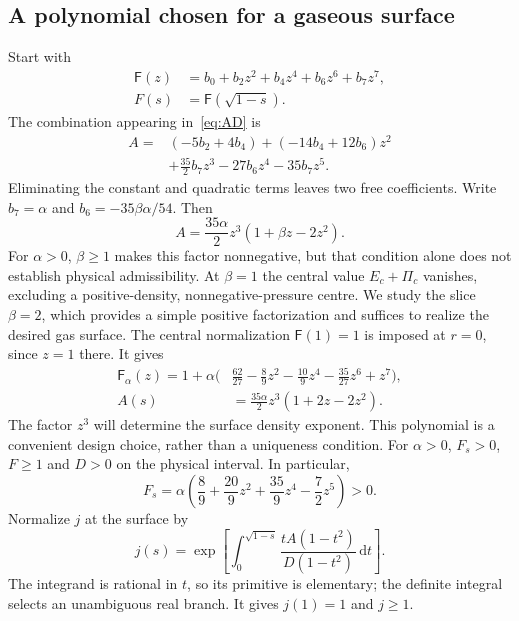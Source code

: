 \documentclass[journal,a4paper]{IEEEtran}
\newcommand{\dd}{\mathrm d}
\begin{document}
\subsection{A polynomial chosen for a gaseous surface}
Start with
\begin{align}
 \mathsf F(z)&=b_0+b_2z^2+b_4z^4+b_6z^6+b_7z^7,\nonumber\\
 F(s)&=\mathsf F(\sqrt{1-s}).
\end{align}
The combination appearing in~\eqref{eq:AD} is
\begin{align}
 A={}&(-5b_2+4b_4)+(-14b_4+12b_6)z^2\nonumber\\
 &+\frac{35}{2}b_7z^3-27b_6z^4-35b_7z^5.
\end{align}
Eliminating the constant and quadratic terms leaves two free coefficients. Write $b_7=\alpha$ and $b_6=-35\beta\alpha/54$. Then
\begin{equation}
 A=\frac{35\alpha}{2}z^3(1+\beta z-2z^2).
\end{equation}
For $\alpha>0$, $\beta\ge1$ makes this factor nonnegative, but that condition alone does not establish physical admissibility. At $\beta=1$ the central value $E_c+\Pi_c$ vanishes, excluding a positive-density, nonnegative-pressure centre. We study the slice $\beta=2$, which provides a simple positive factorization and suffices to realize the desired gas surface. The central normalization $\mathsf F(1)=1$ is imposed at $r=0$, since $z=1$ there. It gives
\begin{align}
 \mathsf F_\alpha(z)=1+\alpha\biggl(&\frac{62}{27}-\frac89z^2-\frac{10}{9}z^4
                  -\frac{35}{27}z^6+z^7\biggr),\label{eq:F}\\
 A(s)&=\frac{35\alpha}{2}z^3(1+2z-2z^2).\label{eq:A}
\end{align}
The factor $z^3$ will determine the surface density exponent. This polynomial is a convenient design choice, rather than a uniqueness condition. For $\alpha>0$, $F_s>0$, $F\ge1$ and $D>0$ on the physical interval. In particular,
\begin{equation}
 F_s=\alpha\left(\frac89+\frac{20}{9}z^2+\frac{35}{9}z^4-\frac72z^5\right)>0.
\end{equation}
Normalize $j$ at the surface by
\begin{equation}
 j(s)=\exp\left[\int_0^{\sqrt{1-s}}
       \frac{tA(1-t^2)}{D(1-t^2)}\,\dd t\right].
 \label{eq:j}
\end{equation}
The integrand is rational in $t$, so its primitive is elementary; the definite integral selects an unambiguous real branch. It gives $j(1)=1$ and $j\ge1$.
\end{document}

